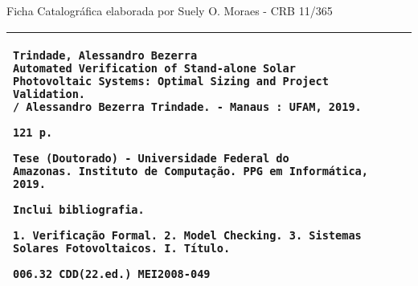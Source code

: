 \thispagestyle{plain}
%    
%    
%    
%
%
\thispagestyle{empty}
\null\vfill

\begin{center}
Ficha Catalográfica elaborada por Suely O. Moraes - CRB 11/365
\begin{tabular}{|p{12.5cm}|}%
\hline
\begin{small}
\begin{verbatim}
Trindade, Alessandro Bezerra
Automated Verification of Stand-alone Solar 
Photovoltaic Systems: Optimal Sizing and Project Validation. 
/ Alessandro Bezerra Trindade. - Manaus : UFAM, 2019.

121 p.

Tese (Doutorado) - Universidade Federal do
Amazonas. Instituto de Computação. PPG em Informática, 2019.

Inclui bibliografia.

1. Verificação Formal. 2. Model Checking. 3. Sistemas
Solares Fotovoltaicos. I. Título.

006.32 CDD(22.ed.) MEI2008-049
\end{verbatim}
\end{small}
\\ \hline
\end{tabular}
\end{center}

\thispagestyle{plain}